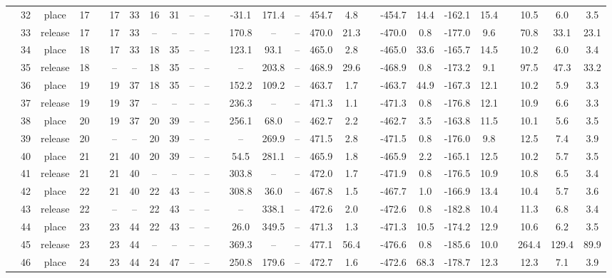 \begin{landscape}
\begin{table}[h!]
\begin{threeparttable}
\begin{tabular}{c cccr ccccccr cccccr ccccr ccc}
				\rowcolor{lightgray} &32 &place &17 &&17 &33 &16 &31 &-- &-- &&-31.1 &171.4 &-- &454.7 &4.8 &&-454.7 &14.4 &-162.1 &15.4 &&10.5 &6.0 &3.5 \\
				\rowcolor{yellow} &33 &release &17 &&17 &33 &-- &-- &-- &-- &&170.8 &-- &-- &470.0 &21.3 &&-470.0 &0.8 &-177.0 &9.6 &&70.8 &33.1 &23.1 \\
				&34 &place &18 &&17 &33 &18 &35 &-- &-- &&123.1 &93.1 &-- &465.0 &2.8 &&-465.0 &33.6 &-165.7 &14.5 &&10.2 &6.0 &3.4 \\
				\rowcolor{yellow} &35 &release &18 &&-- &-- &18 &35 &-- &-- &&-- &203.8 &-- &468.9 &29.6 &&-468.9 &0.8 &-173.2 &9.1 &&97.5 &47.3 &33.2 \\
				&36 &place &19 &&19 &37 &18 &35 &-- &-- &&152.2 &109.2 &-- &463.7 &1.7 &&-463.7 &44.9 &-167.3 &12.1 &&10.2 &5.9 &3.3 \\
				\rowcolor{lightgray} &37 &release &19 &&19 &37 &-- &-- &-- &-- &&236.3 &-- &-- &471.3 &1.1 &&-471.3 &0.8 &-176.8 &12.1 &&10.9 &6.6 &3.3 \\
				\rowcolor{lightgray} &38 &place &20 &&19 &37 &20 &39 &-- &-- &&256.1 &68.0 &-- &462.7 &2.2 &&-462.7 &3.5 &-163.8 &11.5 &&10.1 &5.6 &3.5 \\
				&39 &release &20 &&-- &-- &20 &39 &-- &-- &&-- &269.9 &-- &471.5 &2.8 &&-471.5 &0.8 &-176.0 &9.8 &&12.5 &7.4 &3.9 \\
				&40 &place &21 &&21 &40 &20 &39 &-- &-- &&54.5 &281.1 &-- &465.9 &1.8 &&-465.9 &2.2 &-165.1 &12.5 &&10.2 &5.7 &3.5 \\
				&41 &release &21 &&21 &40 &-- &-- &-- &-- &&303.8 &-- &-- &472.0 &1.7 &&-471.9 &0.8 &-176.5 &10.9 &&10.8 &6.5 &3.4 \\
				&42 &place &22 &&21 &40 &22 &43 &-- &-- &&308.8 &36.0 &-- &467.8 &1.5 &&-467.7 &1.0 &-166.9 &13.4 &&10.4 &5.7 &3.6 \\
				\rowcolor{lightgray} &43 &release &22 &&-- &-- &22 &43 &-- &-- &&-- &338.1 &-- &472.6 &2.0 &&-472.6 &0.8 &-182.8 &10.4 &&11.3 &6.8 &3.4 \\
				\rowcolor{lightgray} &44 &place &23 &&23 &44 &22 &43 &-- &-- &&26.0 &349.5 &-- &471.3 &1.3 &&-471.3 &10.5 &-174.2 &12.9 &&10.6 &6.2 &3.5 \\
				\rowcolor{yellow} &45 &release &23 &&23 &44 &-- &-- &-- &-- &&369.3 &-- &-- &477.1 &56.4 &&-476.6 &0.8 &-185.6 &10.0 &&264.4 &129.4 &89.9 \\
				&46 &place &24 &&23 &44 &24 &47 &-- &-- &&250.8 &179.6 &-- &472.7 &1.6 &&-472.6 &68.3 &-178.7 &12.3 &&12.3 &7.1 &3.9 \\

\end{tabular}
\end{threeparttable}
\end{table}
\end{landscape}
